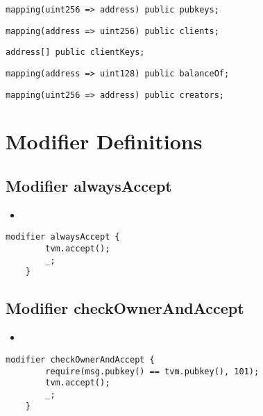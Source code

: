 \begin{lstlisting}[firstnumber=33]
	mapping(uint256 => address) public pubkeys;
\end{lstlisting}

\begin{lstlisting}[firstnumber=34]
	mapping(address => uint256) public clients;
\end{lstlisting}

\begin{lstlisting}[firstnumber=35]
	address[] public clientKeys;
\end{lstlisting}

\begin{lstlisting}[firstnumber=37]
	mapping(address => uint128) public balanceOf;
\end{lstlisting}

\begin{lstlisting}[firstnumber=38]
	mapping(uint256 => address) public creators;
\end{lstlisting}

\section{Modifier Definitions}

\subsection{Modifier alwaysAccept}

\begin{itemize}
\item {}
\end{itemize}

\begin{lstlisting}[firstnumber=45]
	modifier alwaysAccept {
		tvm.accept();
		_;
	}
\end{lstlisting}

\subsection{Modifier checkOwnerAndAccept}

\begin{itemize}
\item \issueError{}
\end{itemize}

\begin{lstlisting}[firstnumber=51]
	modifier checkOwnerAndAccept {
		require(msg.pubkey() == tvm.pubkey(), 101);
		tvm.accept();
		_;
	}
\end{lstlisting}

